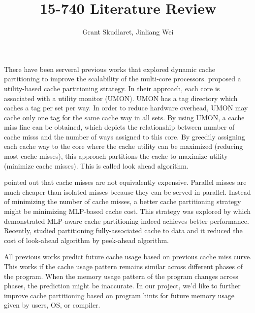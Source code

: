 \documentclass[12pt, a4paper]{llncs}
\begin{document}
\title{15-740 Literature Review}
\author{Grant Skudlaret, Jinliang Wei}
\institute{}

\maketitle

There have been serveral previous works that explored dynamic cache partitioning
to improve the scalability of the multi-core processors. 
\cite{Qureshi:2006:UCP:1194816.1194855} proposed a utility-based cache 
partitioning strategy. In their approach, each core is associated with a utility
monitor (UMON). UMON has a tag directory which caches a tag per set per way. 
In order to reduce hardware overhead, UMON may cache only one tag for the same 
cache way in all sets. By using UMON, a cache miss line can be obtained, which 
depicts the relationship between number of cache misss and the number of ways 
assigned to this core. By greedily assigning each cache way to the core where 
the cache utility can be maximized (reducing most cache misses), this approach
partitions the cache to maximize utility (minimize cache misses). This is called
look ahead algorithm.

\cite{Qureshi:2006:CMC:1150019.1136501} pointed out that cache misses are not 
equivalently expensive. Parallel misses are much cheaper than isolated misses 
because they can be served in parallel. Instead of minimizing the number of 
cache misses, a better cache partitioning strategy might be minimizing MLP-based
cache cost. This strategy was explored by \cite{conf/IEEEpact/MoretoCRV07} which
demonstrated MLP-aware cache partitioning indeed achieves better performance.
Recently, \cite{conf/IEEEpact/BeckmannS13} studied partitioning fully-associated
cache to data and it reduced the cost of look-ahead algorithm by peek-ahead 
algorithm.

All previous works predict future cache usage based on previous cache miss 
curve. This works if the cache usage pattern remains similar across different 
phases of the program. When the memory usage pattern of the program changes 
across phases, the prediction might be inaccurate. In our project, we'd like to
further improve cache partitioning based on program hints for future memory 
usage given by users, OS, or compiler.
\end{document}

